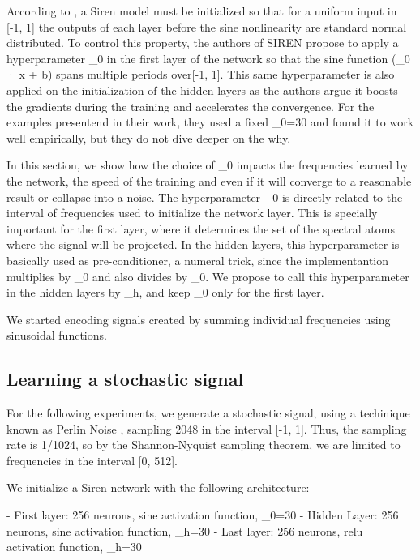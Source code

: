 According to \cite{sitzmann2019siren}, a Siren model must be initialized so that for a uniform input in [-1, 1] the outputs of each layer before the sine nonlinearity are standard normal distributed. To control this property, the authors of SIREN propose to apply a hyperparameter \omega_0 in the first layer of the network so that the sine function \sin(\omega_0 · x + b) spans multiple periods over[-1, 1]. This same hyperparameter is also applied on the initialization of the hidden layers as the authors argue it boosts the gradients during the training and accelerates the convergence. For the examples presentend in their work, they used a fixed \omega_0=30 and found it to work well empirically, but they do not dive deeper on the why. 

In this section, we show how the choice of \omega_0  impacts the frequencies learned by the network, the speed of the training and even if it will converge to a reasonable result or collapse into a noise. The hyperparameter \omega_0 is directly related to the interval of frequencies used to initialize the network layer. This is specially important for the first layer, where it determines the set of the spectral atoms where the signal will be projected. In the hidden layers, this hyperparameter is basically used as pre-conditioner, a numeral trick, since the implementantion multiplies by \omega_0 and also divides by \omega_0. We propose to call this hyperparameter in the hidden layers by \omega_h, and keep \omega_0 only for the first layer.




We started encoding signals created by summing individual frequencies using sinusoidal functions.

\subsection{Learning a stochastic signal}

For the following experiments, we generate a stochastic signal, using a techinique known as Perlin Noise \cite{perlin-1985}, sampling 2048 in the interval [-1, 1]. Thus, the sampling rate is 1/1024, so by the Shannon-Nyquist sampling theorem, we are limited to frequencies in the interval [0, 512]. 

We initialize a Siren network with the following architecture:

- First layer: 256 neurons, sine activation function, \omega_0=30
- Hidden Layer: 256 neurons, sine activation function, \omega_h=30
- Last layer: 256 neurons, relu activation function, \omega_h=30


